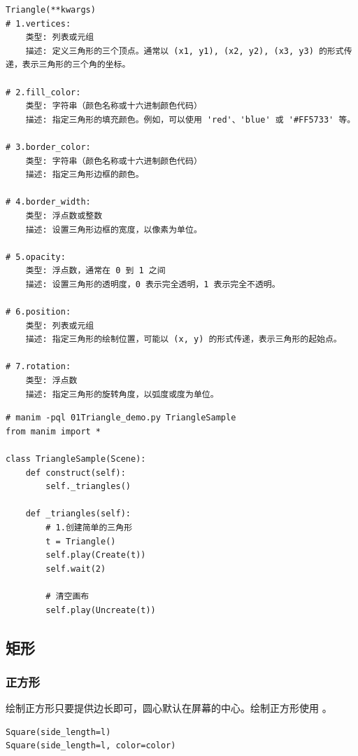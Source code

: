 \begin{lstlisting}[style=demostyle,numbers=none]
Triangle(**kwargs)
# 1.vertices:
    类型: 列表或元组
    描述: 定义三角形的三个顶点。通常以 (x1, y1), (x2, y2), (x3, y3) 的形式传递，表示三角形的三个角的坐标。

# 2.fill_color:
    类型: 字符串（颜色名称或十六进制颜色代码）
    描述: 指定三角形的填充颜色。例如，可以使用 'red'、'blue' 或 '#FF5733' 等。

# 3.border_color:
    类型: 字符串（颜色名称或十六进制颜色代码）
    描述: 指定三角形边框的颜色。

# 4.border_width:
    类型: 浮点数或整数
    描述: 设置三角形边框的宽度，以像素为单位。

# 5.opacity:
    类型: 浮点数，通常在 0 到 1 之间
    描述: 设置三角形的透明度，0 表示完全透明，1 表示完全不透明。

# 6.position:
    类型: 列表或元组
    描述: 指定三角形的绘制位置，可能以 (x, y) 的形式传递，表示三角形的起始点。

# 7.rotation:
    类型: 浮点数
    描述: 指定三角形的旋转角度，以弧度或度为单位。
\end{lstlisting}

\begin{lstlisting}[style=pythonstyle]
# manim -pql 01Triangle_demo.py TriangleSample    
from manim import *

class TriangleSample(Scene):
    def construct(self):
        self._triangles()

    def _triangles(self):
        # 1.创建简单的三角形
        t = Triangle()
        self.play(Create(t))
        self.wait(2)

        # 清空画布
        self.play(Uncreate(t))
\end{lstlisting}

\subsection{矩形}
\subsubsection{正方形}
绘制正方形只要提供边长即可，圆心默认在屏幕的中心。绘制正方形使用 。

\begin{lstlisting}[style=demostyle,numbers=none]
Square(side_length=l)
Square(side_length=l, color=color)

\end{lstlisting}    


